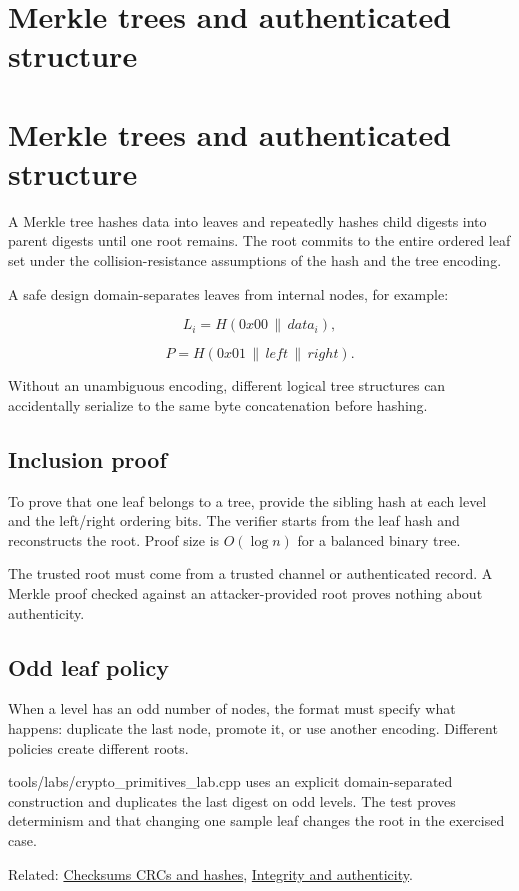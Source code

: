 \hypertarget{appendix-098192f8d46d}{}
\section*{Merkle trees and authenticated structure}
\section{Merkle trees and authenticated structure}\label{merkle-trees-and-authenticated-structure}

A Merkle tree hashes data into leaves and repeatedly hashes child digests into parent digests until one root remains. The root commits to the entire ordered leaf set under the collision-resistance assumptions of the hash and the tree encoding.

A safe design domain-separates leaves from internal nodes, for example:

\[
L_i=H(0x00\,\|\,data_i),
\]

\[
P=H(0x01\,\|\,left\,\|\,right).
\]

Without an unambiguous encoding, different logical tree structures can accidentally serialize to the same byte concatenation before hashing.

\subsection{Inclusion proof}\label{inclusion-proof}

To prove that one leaf belongs to a tree, provide the sibling hash at each level and the left/right ordering bits. The verifier starts from the leaf hash and reconstructs the root. Proof size is \(O(\log n)\) for a balanced binary tree.

The trusted root must come from a trusted channel or authenticated record. A Merkle proof checked against an attacker-provided root proves nothing about authenticity.

\subsection{Odd leaf policy}\label{odd-leaf-policy}

When a level has an odd number of nodes, the format must specify what happens: duplicate the last node, promote it, or use another encoding. Different policies create different roots.

tools/labs/crypto\_primitives\_lab.cpp uses an explicit domain-separated construction and duplicates the last digest on odd levels. The test proves determinism and that changing one sample leaf changes the root in the exercised case.

Related: \hyperref[appendix-ed338677de0a]{Checksums CRCs and hashes}, \hyperref[appendix-cbe594d1ab0a]{Integrity and authenticity}.

